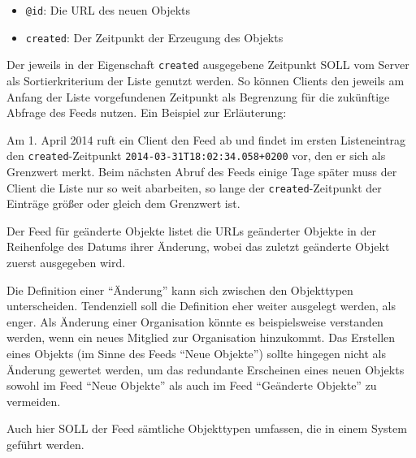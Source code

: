 \documentclass[,a4paper]{article}
\begin{document}
\begin{itemize}
\itemsep1pt\parskip0pt
\item
  \texttt{@id}: Die URL des neuen Objekts
\item
  \texttt{created}: Der Zeitpunkt der Erzeugung des Objekts
\end{itemize}

Der jeweils in der Eigenschaft \texttt{created} ausgegebene Zeitpunkt
SOLL vom Server als Sortierkriterium der Liste genutzt werden. So können
Clients den jeweils am Anfang der Liste vorgefundenen Zeitpunkt als
Begrenzung für die zukünftige Abfrage des Feeds nutzen. Ein Beispiel zur
Erläuterung:

Am 1. April 2014 ruft ein Client den Feed ab und findet im ersten
Listeneintrag den \texttt{created}-Zeitpunkt
\texttt{2014-03-31T18:02:34.058+0200} vor, den er sich als Grenzwert
merkt. Beim nächsten Abruf des Feeds einige Tage später muss der Client
die Liste nur so weit abarbeiten, so lange der
\texttt{created}-Zeitpunkt der Einträge größer oder gleich dem Grenzwert
ist.


Der Feed für geänderte Objekte listet die URLs geänderter Objekte in der
Reihenfolge des Datums ihrer Änderung, wobei das zuletzt geänderte
Objekt zuerst ausgegeben wird.

Die Definition einer ``Änderung'' kann sich zwischen den Objekttypen
unterscheiden. Tendenziell soll die Definition eher weiter ausgelegt
werden, als enger. Als Änderung einer Organisation könnte es
beispielsweise verstanden werden, wenn ein neues Mitglied zur
Organisation hinzukommt. Das Erstellen eines Objekts (im Sinne des Feeds
``Neue Objekte'') sollte hingegen nicht als Änderung gewertet werden, um
das redundante Erscheinen eines neuen Objekts sowohl im Feed ``Neue
Objekte'' als auch im Feed ``Geänderte Objekte'' zu vermeiden.

Auch hier SOLL der Feed sämtliche Objekttypen umfassen, die in einem
System geführt werden.
\end{document}
